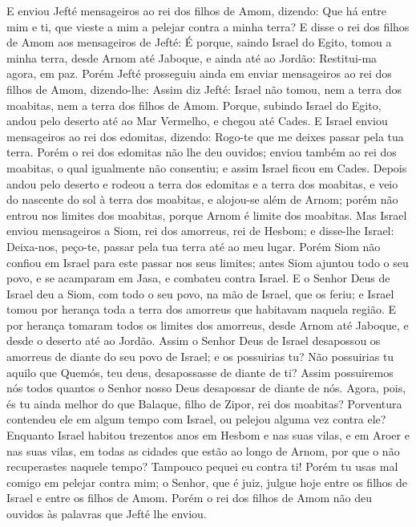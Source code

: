 E enviou Jefté mensageiros ao rei dos filhos de Amom, dizendo:
Que há entre mim e ti, que vieste a mim a pelejar contra a minha
terra? E disse o rei dos filhos de Amom aos mensageiros de
Jefté: É porque, saindo Israel do Egito, tomou a minha terra, desde
Arnom até Jaboque, e ainda até ao Jordão: Restitui-ma agora, em paz.
Porém Jefté prosseguiu ainda em enviar mensageiros ao rei dos
filhos de Amom, dizendo-lhe: Assim diz Jefté: Israel não
tomou, nem a terra dos moabitas, nem a terra dos filhos de Amom.
Porque, subindo Israel do Egito, andou pelo deserto até ao
Mar Vermelho, e chegou até Cades. E Israel enviou mensageiros
ao rei dos edomitas, dizendo: Rogo-te que me deixes passar pela tua
terra. Porém o rei dos edomitas não lhe deu ouvidos; enviou também
ao rei dos moabitas, o qual igualmente não consentiu; e assim Israel
ficou em Cades. Depois andou pelo deserto e rodeou a terra
dos edomitas e a terra dos moabitas, e veio do nascente do sol à
terra dos moabitas, e alojou-se além de Arnom; porém não entrou nos
limites dos moabitas, porque Arnom é limite dos moabitas. Mas
Israel enviou mensageiros a Siom, rei dos amorreus, rei de Hesbom; e
disse-lhe Israel: Deixa-nos, peço-te, passar pela tua terra até ao
meu lugar. Porém Siom não confiou em Israel para este passar
nos seus limites; antes Siom ajuntou todo o seu povo, e se acamparam
em Jasa, e combateu contra Israel. E o Senhor Deus de Israel
deu a Siom, com todo o seu povo, na mão de Israel, que os feriu; e
Israel tomou por herança toda a terra dos amorreus que habitavam
naquela região. E por herança tomaram todos os limites dos
amorreus, desde Arnom até Jaboque, e desde o deserto até ao Jordão.
Assim o Senhor Deus de Israel desapossou os amorreus de
diante do seu povo de Israel; e os possuirias tu? Não
possuirias tu aquilo que Quemós, teu deus, desapossasse de diante de
ti? Assim possuiremos nós todos quantos o Senhor nosso Deus
desapossar de diante de nós. Agora, pois, és tu ainda melhor
do que Balaque, filho de Zipor, rei dos moabitas? Porventura
contendeu ele em algum tempo com Israel, ou pelejou alguma vez
contra ele? Enquanto Israel habitou trezentos anos em Hesbom
e nas suas vilas, e em Aroer e nas suas vilas, em todas as cidades
que estão ao longo de Arnom, por que o não recuperastes naquele
tempo? Tampouco pequei eu contra ti! Porém tu usas mal comigo
em pelejar contra mim; o Senhor, que é juiz, julgue hoje entre os
filhos de Israel e entre os filhos de Amom. Porém o rei dos
filhos de Amom não deu ouvidos às palavras que Jefté lhe enviou.

